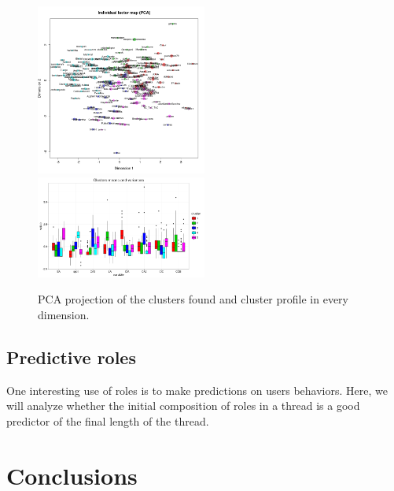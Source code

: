\documentclass[smallextended]{svjour3}          %
\begin{document}
\begin{figure}
	\centering
	\includegraphics[width=0.5\textwidth]{PCA_nocolor}
	\includegraphics[width=0.5\textwidth]{whiskers}
	\caption{PCA projection of the clusters found and cluster profile in every dimension.}
	\label{fig:PCA}
\end{figure}

\subsection{Predictive roles}
One interesting use of roles is to make predictions on users behaviors. Here, we will analyze whether the initial composition of roles in a thread is a good predictor of the final length of the thread.

\section{Conclusions}
 
% 
% 

\end{document}
